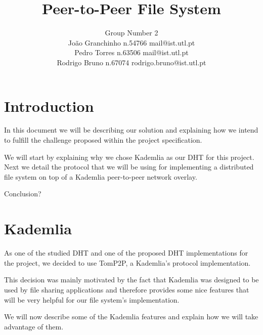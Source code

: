 \documentclass[times,9pt,article]{llncs}
\begin{document}
\title{Peer-to-Peer File System}
\author{Group Number 2 \\
Jo\~ao Granchinho n.54766 mail@ist.utl.pt \\
Pedro Torres  n.63506 mail@ist.utl.pt \\
Rodrigo Bruno n.67074 rodrigo.bruno@ist.utl.pt}
\maketitle


\section{Introduction}
In this document we will be describing our solution and explaining how we intend
to fulfill the challenge proposed within the project specification.

We will start by explaining why we chose Kademlia as our DHT for this project.
Next we detail the protocol that we will be using for implementing a distributed
file system on top of a Kademlia peer-to-peer network overlay.

Conclusion?

\section{Kademlia}

As one of the studied DHT and one of the proposed DHT implementations for the 
project, we decided to use TomP2P, a Kademlia's protocol implementation.

This decision was mainly motivated by the fact that Kademlia was designed to be
used by file sharing applications and therefore provides some nice features that
will be very helpful for our file system's implementation. 

We will now describe some of the Kademlia features and explain how we will take 
advantage of them. 
\end{document}
